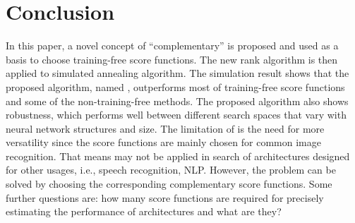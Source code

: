 \documentclass[sigconf]{acmart}
\begin{document}
    \section{Conclusion}
    \label{sec:conclusion}
    In this paper, a novel concept of ``complementary'' is proposed and used as a basis to choose 
    training-free score functions. The new rank algorithm is then applied to simulated annealing 
    algorithm. The simulation result shows that the proposed algorithm, named \palg{}, outperforms 
    most of training-free score functions and some of the non-training-free methods. 
    The proposed algorithm also shows robustness, which performs well between different search 
    spaces that vary with neural network structures and size. 
    The limitation of \palg{} is the need for more versatility since the score functions are mainly chosen 
    for common image recognition. That means \palg{} may not be applied in search of architectures 
    designed for other usages, i.e., speech recognition, NLP. However, the problem can be solved 
    by choosing the corresponding complementary score functions. Some further questions are: how many 
    score functions are required for precisely estimating the performance of architectures and what are they? 
    
    
    
\end{document}
